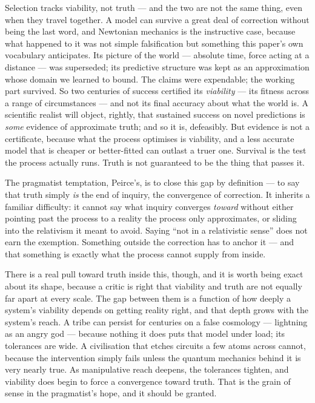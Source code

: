 \documentclass[11pt, a4paper]{report}
\begin{document}
Selection tracks viability, not truth --- and the two are not the same thing, even when they travel together. A model can survive a great deal of correction without being the last word, and Newtonian mechanics is the instructive case, because what happened to it was not simple falsification but something this paper's own vocabulary anticipates. Its picture of the world --- absolute time, force acting at a distance --- was superseded; its predictive structure was kept as an approximation whose domain we learned to bound. The claims were expendable; the working part survived. So two centuries of success certified its \textit{viability} --- its fitness across a range of circumstances --- and not its final accuracy about what the world is. A scientific realist will object, rightly, that sustained success on novel predictions is \textit{some} evidence of approximate truth; and so it is, defeasibly. But evidence is not a certificate, because what the process optimises is viability, and a less accurate model that is cheaper or better-fitted can outlast a truer one. Survival is the test the process actually runs. Truth is not guaranteed to be the thing that passes it.

The pragmatist temptation, Peirce's, is to close this gap by definition --- to say that truth simply \textit{is} the end of inquiry, the convergence of correction. It inherits a familiar difficulty: it cannot say what inquiry converges \textit{toward} without either pointing past the process to a reality the process only approximates, or sliding into the relativism it meant to avoid. Saying ``not in a relativistic sense'' does not earn the exemption. Something outside the correction has to anchor it --- and that something is exactly what the process cannot supply from inside.

There is a real pull toward truth inside this, though, and it is worth being exact about its shape, because a critic is right that viability and truth are not equally far apart at every scale. The gap between them is a function of how deeply a system's viability depends on getting reality right, and that depth grows with the system's reach. A tribe can persist for centuries on a false cosmology --- lightning as an angry god --- because nothing it does puts that model under load; its tolerances are wide. A civilisation that etches circuits a few atoms across cannot, because the intervention simply fails unless the quantum mechanics behind it is very nearly true. As manipulative reach deepens, the tolerances tighten, and viability does begin to force a convergence toward truth. That is the grain of sense in the pragmatist's hope, and it should be granted.
\end{document}
